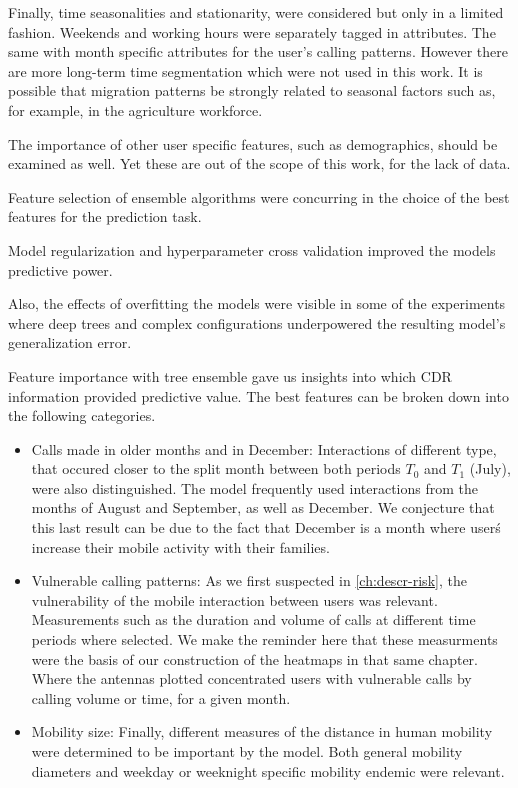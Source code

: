 Finally, time seasonalities and stationarity, were considered but only in a limited fashion.
Weekends and working hours were separately tagged in attributes.
The same with month specific attributes for the user's calling patterns.
However there are more long-term time segmentation which were not used in this work.
It is possible that migration patterns be strongly related to seasonal factors such as, for example, in the agriculture workforce.

The importance of other user specific features, such as demographics, should be examined as well.
Yet these are out of the scope of this work, for the lack of data.








Feature selection of ensemble algorithms were concurring in the choice of the best features for the prediction task.

Model regularization and hyperparameter cross validation improved the models predictive power.

Also, the effects of overfitting the models were visible in some of the experiments where deep trees and complex configurations underpowered the resulting model's generalization error.

Feature importance with tree ensemble gave us insights into which CDR information provided
predictive value.
The best features can be broken down into the following categories.

\begin{itemize}

    \item Calls made in older months and in December: Interactions of different type, that occured closer to the split month between both periods $T_0$ and $T_1$ (July), were also distinguished.
    The model frequently used interactions from the months of August and September, as well as December.
    We conjecture that this last result can be due to the fact that December is a month where user\'s increase their mobile activity with their families.

    \item Vulnerable calling patterns: As we first suspected in \cref{ch:descr-risk}, the vulnerability of the mobile interaction between users was relevant.
    Measurements such as the duration and volume of calls at different time periods where selected.
    We make the reminder here that these measurments were the basis of our construction of the heatmaps in that same chapter.
    Where the antennas plotted concentrated users with vulnerable calls by calling volume or time, for a given month.

    \item Mobility size: Finally, different measures of the distance in human mobility were
determined to be important by the model.
Both general mobility diameters and weekday or weeknight specific mobility endemic were relevant.

\end{itemize}

